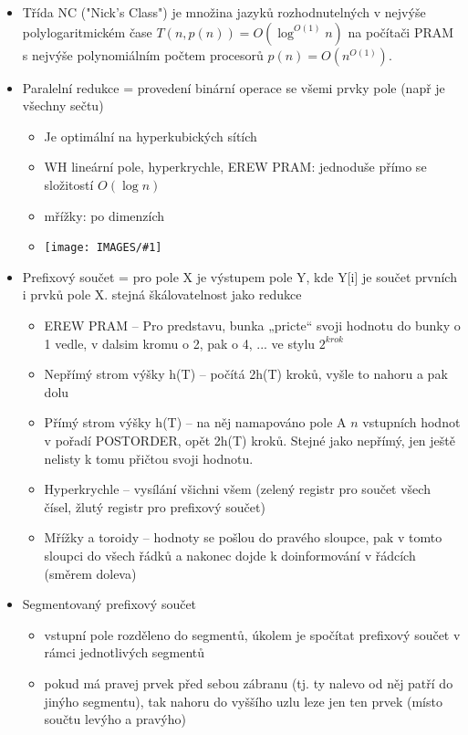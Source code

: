 \documentclass[a4paper,hidelinks]{article}
\newcommand{\myimage}[1] {\texttt{[image: IMAGES/\#1]}}
\begin{document}
\begin{itemize}
    \item Třída NC ("Nick's Class") je množina jazyků rozhodnutelných v nejvýše polylogaritmickém čase $T(n,p(n)) = O(\log^{O(1)}n)$ na počítači PRAM s nejvýše polynomiálním počtem procesorů $p(n)=O(n^{O(1)})$.
    \item Paralelní redukce = provedení binární operace se všemi prvky pole (např je všechny sečtu)
    \begin{itemize}
        \item Je optimální na hyperkubických sítích
        \item WH lineární pole, hyperkrychle, EREW PRAM: jednoduše přímo se složitostí $O(\log n)$
        \item mřížky: po dimenzích
        \item \myimage{redukce}
    \end{itemize}
    \item Prefixový součet = pro pole X je výstupem pole Y, kde Y[i] je součet prvních i prvků pole X. stejná škálovatelnost jako redukce
    \begin{itemize}
        \item EREW PRAM -- Pro predstavu, bunka „pricte“ svoji hodnotu do bunky o 1 vedle, v dalsim kromu o 2, pak o 4, ... ve stylu $2^{krok}$
        \item Nepřímý strom výšky h(T) -- počítá 2h(T) kroků, vyšle to nahoru a pak dolu
        \item Přímý strom výšky h(T) -- na něj namapováno pole A $n$ vstupních hodnot v pořadí POSTORDER, opět 2h(T) kroků. Stejné jako nepřímý, jen ještě nelisty k tomu přičtou svoji hodnotu.
        \item Hyperkrychle -- vysílání všichni všem (zelený registr pro součet všech čísel, žlutý registr pro prefixový součet)
        \item Mřížky a toroidy -- hodnoty se pošlou do pravého sloupce, pak v tomto sloupci do všech řádků a nakonec dojde k doinformování v řádcích (směrem doleva)
    \end{itemize}
    \item Segmentovaný prefixový součet
    \begin{itemize}
        \item vstupní pole rozděleno do segmentů, úkolem je spočítat prefixový součet v rámci jednotlivých segmentů
        \item pokud má pravej prvek před sebou zábranu (tj. ty nalevo od něj patří do jinýho segmentu), tak nahoru do vyššího uzlu leze jen ten prvek (místo součtu levýho a pravýho)

\end{itemize}
\end{itemize}
\end{document}
